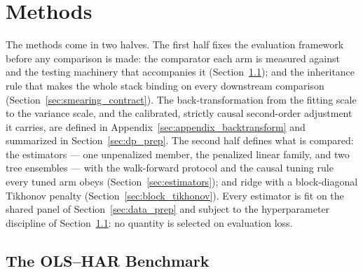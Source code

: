 \section{Methods}
\label{sec:methods}


The methods come in two halves. The first half fixes the evaluation
framework before any comparison is made: the comparator each arm is
measured against and the testing machinery that accompanies it
(Section~\ref{sec:dp_benchmark}); and the inheritance rule that makes
the whole stack binding on every downstream comparison
(Section~\ref{sec:smearing_contract}). The back-transformation from the
fitting scale to the variance scale, and the calibrated, strictly causal
second-order adjustment it carries, are defined in
Appendix~\ref{sec:appendix_backtransform} and summarized in
Section~\ref{sec:dp_prep}. The second
half defines what is compared: the estimators --- one unpenalized
member, the penalized linear family, and two tree ensembles --- with the
walk-forward protocol and the causal tuning rule every tuned arm obeys
(Section~\ref{sec:estimators}); and ridge with a block-diagonal
Tikhonov penalty
(Section~\ref{sec:block_tikhonov}).
Every estimator is fit on the shared panel of
Section~\ref{sec:data_prep} and subject to the hyperparameter discipline
of Section~\ref{sec:dp_benchmark}: no quantity is selected on evaluation
loss.

\subsection{The OLS--HAR Benchmark}
\label{sec:dp_benchmark}

